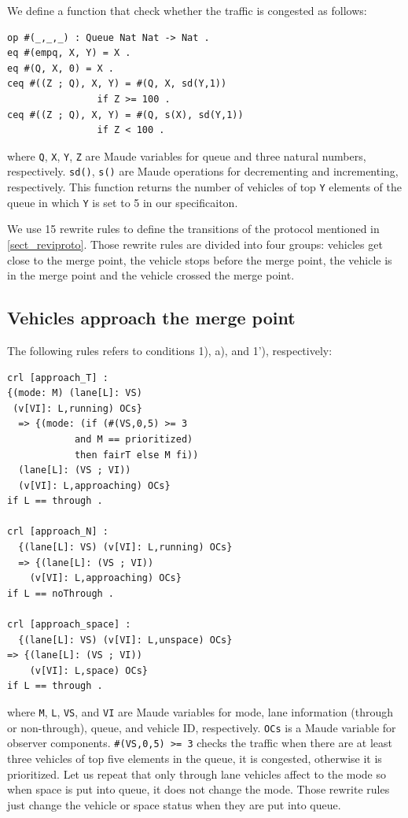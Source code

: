 \documentclass[10pt, conference, compsocconf]{IEEEtran}
\begin{document}
We define a function that check whether the traffic is congested as follows:
\begin{small}
\begin{verbatim}
op #(_,_,_) : Queue Nat Nat -> Nat .
eq #(empq, X, Y) = X .
eq #(Q, X, 0) = X .
ceq #((Z ; Q), X, Y) = #(Q, X, sd(Y,1)) 
                if Z >= 100 .
ceq #((Z ; Q), X, Y) = #(Q, s(X), sd(Y,1)) 
                if Z < 100 .
\end{verbatim}
\end{small}
\noindent where \verb!Q!, \verb!X!, \verb!Y!, \verb!Z! are Maude variables 
for queue and three natural numbers, respectively. \verb!sd()!, \verb!s()! are 
Maude operations for decrementing and incrementing, respectively.
This function returns the number of vehicles of top \verb!Y! elements of the queue
in which \verb!Y! is set to 5 in our specificaiton. 
 
We use 15 rewrite rules to define the transitions of the protocol mentioned in \ref{sect_reviproto}.
Those rewrite rules are divided into four groups: vehicles get close to the merge point,
the vehicle stops before the merge point, the vehicle is in the merge point and 
the vehicle crossed the merge point.

\subsection{Vehicles approach the merge point}
The following rules refers to conditions 1), a), and 1'), respectively:
\begin{small}
  \begin{verbatim}
crl [approach_T] : 
{(mode: M) (lane[L]: VS) 
 (v[VI]: L,running) OCs} 
  => {(mode: (if (#(VS,0,5) >= 3 
            and M == prioritized) 
            then fairT else M fi))
  (lane[L]: (VS ; VI)) 
  (v[VI]: L,approaching) OCs} 
if L == through .

crl [approach_N] : 
  {(lane[L]: VS) (v[VI]: L,running) OCs} 
  => {(lane[L]: (VS ; VI)) 
    (v[VI]: L,approaching) OCs} 
if L == noThrough .

crl [approach_space] : 
  {(lane[L]: VS) (v[VI]: L,unspace) OCs} 
=> {(lane[L]: (VS ; VI)) 
    (v[VI]: L,space) OCs} 
if L == through .
  \end{verbatim}
\end{small}

\noindent where \verb!M!, \verb!L!, \verb!VS!, and \verb!VI! 
are Maude variables for mode, lane information (through or non-through), queue, and vehicle ID, respectively.
\verb!OCs! is a Maude variable for observer components.
\verb!#(VS,0,5) >= 3! checks the traffic when there are at least three
vehicles of top five elements in the queue, it is congested, otherwise 
it is prioritized. Let us repeat that only through lane vehicles affect
to the mode so when space is put into queue, it does not change the mode.
Those rewrite rules just change the vehicle or space status when they are put into queue.
\end{document}
